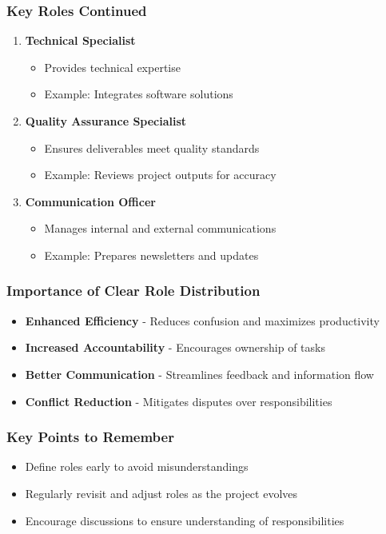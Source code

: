 \documentclass[aspectratio=169]{beamer}
\begin{document}
\begin{frame}[fragile]
    \frametitle{Key Roles Continued}
    \begin{enumerate}[resume]
        \item \textbf{Technical Specialist}
            \begin{itemize}
                \item Provides technical expertise
                \item Example: Integrates software solutions
            \end{itemize}
        \item \textbf{Quality Assurance Specialist}
            \begin{itemize}
                \item Ensures deliverables meet quality standards
                \item Example: Reviews project outputs for accuracy
            \end{itemize}
        \item \textbf{Communication Officer}
            \begin{itemize}
                \item Manages internal and external communications
                \item Example: Prepares newsletters and updates
            \end{itemize}
    \end{enumerate}
\end{frame}

\begin{frame}[fragile]
    \frametitle{Importance of Clear Role Distribution}
    \begin{itemize}
        \item \textbf{Enhanced Efficiency} - Reduces confusion and maximizes productivity
        \item \textbf{Increased Accountability} - Encourages ownership of tasks
        \item \textbf{Better Communication} - Streamlines feedback and information flow
        \item \textbf{Conflict Reduction} - Mitigates disputes over responsibilities
    \end{itemize}
\end{frame}

\begin{frame}[fragile]
    \frametitle{Key Points to Remember}
    \begin{itemize}
        \item Define roles early to avoid misunderstandings
        \item Regularly revisit and adjust roles as the project evolves
        \item Encourage discussions to ensure understanding of responsibilities
    \end{itemize}
\end{frame}
\end{document}
